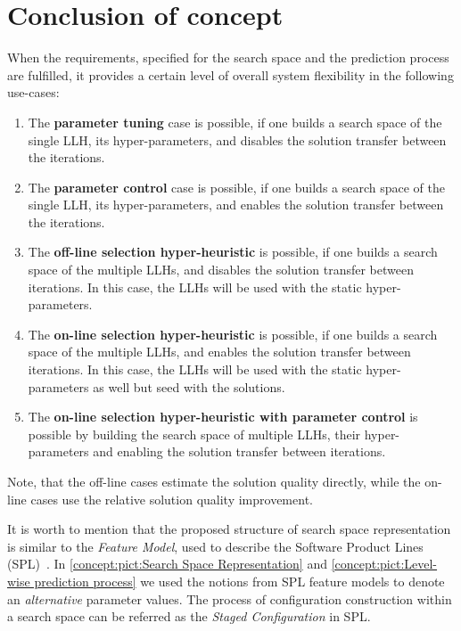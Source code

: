 \section{Conclusion of concept}\label{concept: conclution}
When the requirements, specified for the search space and the prediction process are fulfilled, it provides a certain level of overall system flexibility in the following use-cases:
\begin{enumerate}
	\item The \textbf{parameter tuning} case is possible, if one builds a search space of the single LLH, its hyper-parameters, and disables the solution transfer between the iterations.
	
	\item The \textbf{parameter control} case is possible, if one builds a search space of the single LLH, its hyper-parameters, and enables the solution transfer between the iterations. 
	
	\item The \textbf{off-line selection hyper-heuristic} is possible, if one builds a search space of the multiple LLHs, and disables the solution transfer between iterations. In this case, the LLHs will be used with the static hyper-parameters.
	
	\item The \textbf{on-line selection hyper-heuristic} is possible, if one builds a search space of the multiple LLHs, and enables the solution transfer between iterations. In this case, the LLHs will be used with the static hyper-parameters as well but seed with the solutions.
	
	\item The \textbf{on-line selection hyper-heuristic with parameter control} is possible by building the search space of multiple LLHs, their hyper-parameters and enabling the solution transfer between iterations.
\end{enumerate}

Note, that the off-line cases estimate the solution quality directly, while the on-line cases use the relative solution quality improvement.

It is worth to mention that the proposed structure of search space representation is similar to the \emph{Feature Model}, used to describe the Software Product Lines (SPL)~\cite{schroeter2012multi}. In \cref{concept:pict:Search Space Representation} and \cref{concept:pict:Level-wise prediction process} we used the notions from SPL feature models to denote an \emph{alternative} parameter values. The process of configuration construction within a search space can be referred as the \emph{Staged Configuration} in SPL.